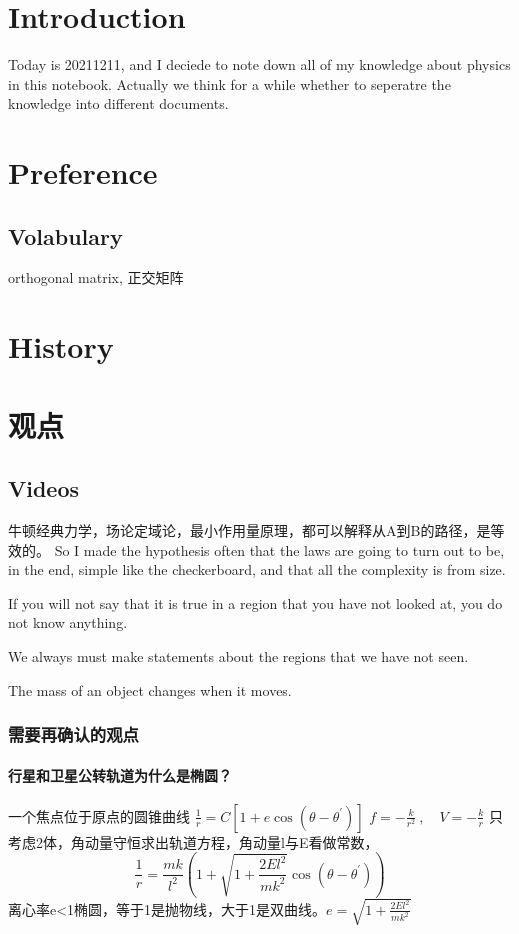 \chapter{Introduction}
Today is 20211211, and I deciede to note down all of my knowledge about physics in this notebook. Actually we think for a while whether to seperatre the knowledge into different documents.

\chapter{Preference}



\section{Volabulary}
orthogonal matrix, 正交矩阵


\chapter{History}



\chapter{观点}

\section{Videos}

牛顿经典力学，场论定域论，最小作用量原理，都可以解释从A到B的路径，是等效的。
So I made the hypothesis often that the laws are going to turn out to be, in the end, simple like the checkerboard, and that all the complexity is from size.

If you will not say that it is true in a region that you have not looked at, you do not know anything.

We always must make statements about the regions that we have not seen.

The mass of an object changes when it moves.

\subsection{需要再确认的观点}
\subsubsection{行星和卫星公转轨道为什么是椭圆？}

一个焦点位于原点的圆锥曲线
$\frac{1}{r}=C\left[1+e\cos(\theta-\theta^{\prime})\right]$
$f=-\frac{k}{r^{2}}~,\quad V=-\frac{k}{r}$
只考虑2体，角动量守恒求出轨道方程，角动量l与E看做常数，
$$\frac{1}{r}=\frac{mk}{l^{2}}\left(1+\sqrt{1+\frac{2El^{2}}{mk^{2}}}\cos(\theta-\theta^{\prime})\right)$$
离心率e<1椭圆，等于1是抛物线，大于1是双曲线。$e=\sqrt{1+\frac{2El^{2}}{mk^{2}}}$



